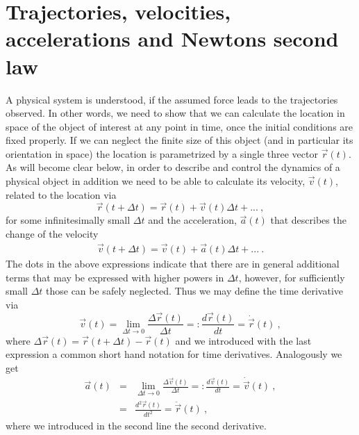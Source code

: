 \documentclass[12pt,ngerman,american]{iopart}
\begin{document}
\section{Trajectories, velocities, accelerations and Newtons second law}\label{sec:tva}

A physical system is understood, if the assumed force leads to the trajectories observed.
In other words, we need to show that we can calculate the location in space of the object of interest at any point in time, once the initial conditions are fixed properly.
If we can neglect the finite size of this object (and in particular its orientation in space) the location is parametrized by a single three vector $\vec r(t)$.
As will become clear below, in order to describe and control the dynamics of a physical object in addition we need to be able to calculate its velocity, $\vec v(t)$, related to the location via
\begin{equation}\label{eq:x_update}
\vec r(t+\Delta t) = \vec r(t) + \vec v(t) \Delta t + ... \ , \label{eq:vdef}
\end{equation}
for some infinitesimally small $\Delta t$ and the acceleration, $\vec a(t)$ that describes the change of the velocity
\begin{eqnarray}\label{eq:v_update}
\vec v(t+\Delta t) = \vec v(t) + \vec a(t) \Delta t + ...\ . \label{eq:adef}
\end{eqnarray}
The dots in the above expressions indicate that there are in general additional terms that may be expressed with higher powers in $\Delta t$, however, for sufficiently small $\Delta t$ those can be safely neglected.
Thus we may define the time derivative via
\begin{equation}
\vec v(t) = \lim_{\Delta t\to 0} \frac{\Delta \vec r(t)}{\Delta t} =: \frac{d\vec r(t)}{d t}  = \dot{\vec  r}(t) \ ,
\end{equation}
where $\Delta \vec r(t)=\vec r(t+\Delta t)-\vec r(t)$ and we introduced with the last expression a common short hand notation for time derivatives.
Analogously we get
\begin{eqnarray}
\vec a(t) &=& \lim_{\Delta t\to 0} \frac{\Delta \vec v(t)}{\Delta t} =: \frac{d\vec v(t)}{dt}  = \dot{\vec v}(t) \ , \\
 &=& \frac{d^2\vec r(t)}{dt^2}  = \ddot{\vec r}(t) \ ,
\end{eqnarray}
where we introduced in the second line the second derivative.
\end{document}
